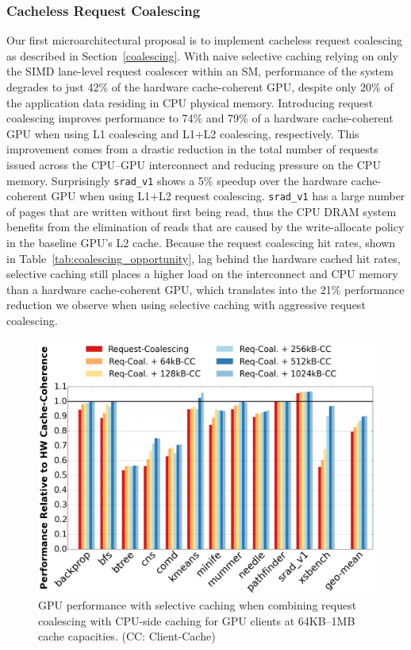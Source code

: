 \subsubsection{Cacheless Request Coalescing}
\label{mshrresults}
Our first microarchitectural proposal is to implement cacheless request coalescing as described in Section~\ref{coalescing}.
With naive selective caching relying on only the SIMD lane-level request coalescer within an SM, performance of the system degrades 
to just 42\% of the hardware cache-coherent GPU, despite only 20\% of the application data residing in CPU physical memory.  
Introducing request coalescing improves performance to 74\% and 79\% of a
hardware cache-coherent GPU
when using L1 coalescing and L1+L2 coalescing, respectively.  This improvement comes from
a drastic reduction in the total number of requests issued across the CPU--GPU
interconnect and reducing pressure on the CPU memory. Surprisingly \texttt{srad\_v1} shows
a 5\% speedup over the hardware cache-coherent GPU when using L1+L2 request coalescing. \texttt{srad\_v1} has 
a large number of pages
that are written without first being read, thus the CPU DRAM system benefits from the elimination of reads that are caused
by the write-allocate policy in the baseline GPU's L2 cache.
Because the request coalescing hit rates, shown in
Table~\ref{tab:coalescing_opportunity}, lag behind the hardware cached hit rates,
selective caching still places a higher load on the interconnect and CPU memory
than a hardware cache-coherent GPU, which translates
into the 21\% performance reduction we observe when using selective caching with aggressive request coalescing.

\begin{figure}[t]
\includegraphics[width=1.0\columnwidth]{figures/unconstrainedperformanceMshrMCCache.png}
\caption{GPU performance with selective caching when combining request coalescing with CPU-side
caching for GPU clients at 64KB--1MB cache capacities. (CC: Client-Cache)}
\label{fig:mccache}
\end{figure}

